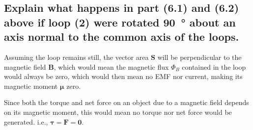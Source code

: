 \documentclass[a4paper]{scrartcl}
\begin{document}
\subsection{Explain what happens in part (6.1) and (6.2) above if loop (2) were rotated \SI{90}{\degree} about an axis normal to the common axis of the loops.}
Assuming the loop remains still, the vector area \(\mathbf{S}\) will be perpendicular to the magnetic field \(\mathbf{B}\), which would mean the magnetic flux \(\Phi_B\) contained in the loop would always be zero, which would then mean no EMF nor current, making its magnetic moment \(\boldsymbol{\mu}\) zero.

Since both the torque and net force on an object due to a magnetic field depends on its magnetic moment, this would mean no torque nor net force would be generated. i.e., \(\boldsymbol{\tau} = \mathbf{F} = \mathbf{0}\).
\end{document}
